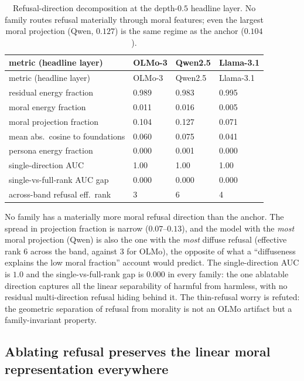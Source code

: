 \begin{longtable}[]{@{}llll@{}}
\caption{Refusal-direction decomposition at the depth-\(0.5\) headline layer. No
family routes refusal materially through moral features; even the largest moral
projection (Qwen, \(0.127\)) is the same regime as the anchor (\(0.104\)).
\label{tab:decomp}}\tabularnewline
\toprule\noalign{}
metric (headline layer) & OLMo-3 & Qwen2.5 & Llama-3.1 \\
\midrule\noalign{}
\endfirsthead
\toprule\noalign{}
metric (headline layer) & OLMo-3 & Qwen2.5 & Llama-3.1 \\
\midrule\noalign{}
\endhead
\bottomrule\noalign{}
\endlastfoot
residual energy fraction & 0.989 & 0.983 & 0.995 \\
moral energy fraction & 0.011 & 0.016 & 0.005 \\
moral projection fraction & 0.104 & 0.127 & 0.071 \\
mean abs.~cosine to foundations & 0.060 & 0.075 & 0.041 \\
persona energy fraction & 0.000 & 0.001 & 0.000 \\
single-direction AUC & 1.00 & 1.00 & 1.00 \\
single-vs-full-rank AUC gap & 0.000 & 0.000 & 0.000 \\
across-band refusal eff.~rank & 3 & 6 & 4 \\
\end{longtable}

No family has a materially more moral refusal direction than the anchor. The
spread in projection fraction is narrow (\(0.07\)--\(0.13\)), and the model with the
\emph{most} moral projection (Qwen) is also the one with the \emph{most} diffuse refusal
(effective rank \(6\) across the band, against \(3\) for OLMo), the opposite of what a
``diffuseness explains the low moral fraction'' account would predict. The
single-direction AUC is \(1.0\) and the single-vs-full-rank gap is \(0.000\) in every
family: the one ablatable direction captures all the linear separability of
harmful from harmless, with no residual multi-direction refusal hiding behind it.
The thin-refusal worry is refuted: the geometric separation of refusal from
morality is not an OLMo artifact but a family-invariant property.

\subsection{Ablating refusal preserves the linear moral representation everywhere}\label{ablating-refusal-preserves-the-linear-moral-representation-everywhere}

